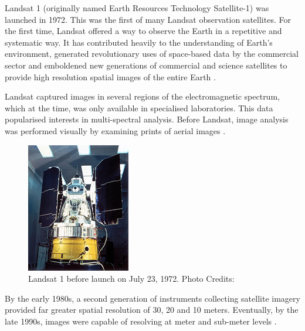 Landsat 1 (originally named Earth Resources Technology Satellite-1) was launched in 1972. This was the first of many Landsat observation satellites. For the first time, Landsat
offered a way to observe the Earth in a repetitive and systematic way. It has contributed heavily to the understanding of Earth's environment, generated revolutionary uses of space-based data by the commercial sector and emboldened new generations of commercial and science satellites to provide high resolution spatial images of the entire Earth \cite{campbell2011introduction, Williams:2006:0099-1112:1171}.

\par

Landsat captured images in several regions of the electromagnetic spectrum, which at the time, was only available in specialised laboratories. This data popularised interests in multi-spectral analysis. Before Landsat, image analysis was performed visually by examining prints of aerial images \cite{campbell2011introduction}.

\begin{figure}[H]
\centering

\includegraphics[totalheight=0.25\textheight]{Landsat1.jpg}
\caption{Landsat 1 before launch on July 23, 1972. Photo Credits: \cite{landsat1}
}
\label{Fig:LANDSAT}
\end{figure}

By the early 1980s, a second generation of instruments collecting satellite imagery provided far greater spatial resolution of 30, 20 and 10 meters. Eventually, by the late 1990s, images were capable of resolving at meter and  sub-meter levels \cite{campbell2011introduction}.

\par


